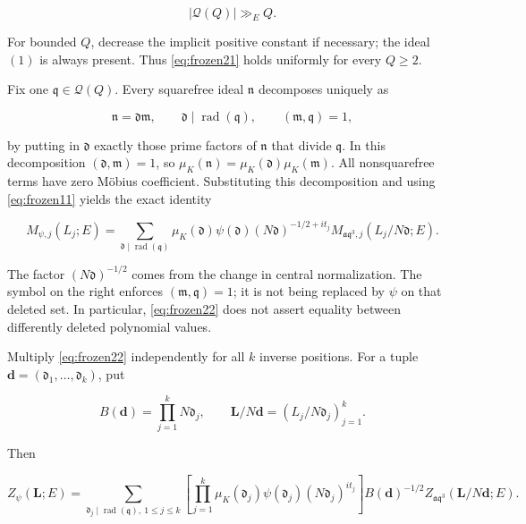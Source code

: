 \documentclass[11pt]{article}
\theoremstyle{remark}\newtheorem{remark}[theorem]{Remark}
\begin{document}
\begin{equation}
|\mathcal Q(Q)|\gg_E Q.\label{eq:frozen21}
\end{equation}

For bounded \(Q\), decrease the implicit positive constant if necessary; the ideal \((1)\) is always present. Thus \eqref{eq:frozen21} holds uniformly for every \(Q\ge2\).

Fix one \(\mathfrak q\in\mathcal Q(Q)\). Every squarefree ideal \(\mathfrak n\) decomposes uniquely as

\[
\mathfrak n=\mathfrak d\mathfrak m,
\qquad \mathfrak d\mid\operatorname{rad}(\mathfrak q),
\qquad (\mathfrak m,\mathfrak q)=1,
\]

by putting in \(\mathfrak d\) exactly those prime factors of \(\mathfrak n\) that divide \(\mathfrak q\). In this decomposition \((\mathfrak d,\mathfrak m)=1\), so \(\mu_K(\mathfrak n)=\mu_K(\mathfrak d)\mu_K(\mathfrak m)\). All nonsquarefree terms have zero Möbius coefficient. Substituting this decomposition and using \eqref{eq:frozen11} yields the exact identity

\begin{equation}
M_{\psi,j}(L_j;E)
=\sum_{\mathfrak d\mid\operatorname{rad}(\mathfrak q)}
\mu_K(\mathfrak d)\psi(\mathfrak d)
(N\mathfrak d)^{-1/2+it_j}
M_{\mathfrak a\mathfrak q^3,j}(L_j/N\mathfrak d;E).
\label{eq:frozen22}
\end{equation}

The factor \((N\mathfrak d)^{-1/2}\) comes from the change in central normalization. The symbol on the right enforces \((\mathfrak m,\mathfrak q)=1\); it is not being replaced by \(\psi\) on that deleted set. In particular, \eqref{eq:frozen22} does not assert equality between differently deleted polynomial values.

Multiply \eqref{eq:frozen22} independently for all \(k\) inverse positions. For a tuple \(\mathbf d=(\mathfrak d_1,\ldots,\mathfrak d_k)\), put

\[
B(\mathbf d)=\prod_{j=1}^kN\mathfrak d_j,
\qquad \mathbf L/ N\mathbf d=(L_j/N\mathfrak d_j)_{j=1}^k.
\]

Then

\begin{equation}
Z_\psi(\mathbf L;E)
=\sum_{\mathfrak d_j\mid\operatorname{rad}(\mathfrak q),\ 1\le j\le k}
\left[\prod_{j=1}^k\mu_K(\mathfrak d_j)\psi(\mathfrak d_j)(N\mathfrak d_j)^{it_j}\right]
B(\mathbf d)^{-1/2}
Z_{\mathfrak a\mathfrak q^3}(\mathbf L/N\mathbf d;E).
\label{eq:frozen23}
\end{equation}
\end{document}
